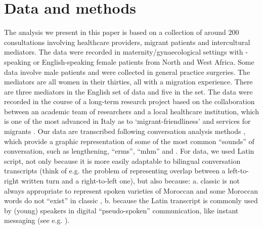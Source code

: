 \documentclass[output=paper]{LSP/langsci}
\begin{document}
\section{Data and methods}

The analysis we present in this paper is based on a collection of around 200 consultations involving healthcare providers, migrant patients and intercultural mediators. The data were recorded in maternity/gynaecological settings with -speaking or English-speaking female patients from North and West Afri\-ca. Some data involve male patients and were collected in general practice surgeries. The mediators are all women in their thirties, all with a migration experience. There are three mediators in the English set of data and five in the  set. The data were recorded in the course of a long-term research project based on the collaboration between an academic team of researchers and a local healthcare institution, which is one of the most advanced in Italy as to `migrant-friendliness' and services for migrants \citep{Chiarenza2008}. Our data are transcribed following conversation analysis methods \citep{Jefferson1978, Psathas1990}, which provide a graphic representation of some of the most common ``sounds'' of conversation, such as lengthening, ``erms'', ``mhm'' and . For  data, we used Latin script, not only because it is more easily adaptable to bilingual conversation transcripts (think of e.g. the problem of representing overlap between a left-to-right written  turn and a right-to-left  one), but also because: a. classic  is not always appropriate to represent spoken varieties of  {Moroccan} and some  {Moroccan} words do not ``exist'' in classic , b. because the Latin transcript is commonly used by  (young) speakers in digital ``pseudo-spoken'' communication, like instant messaging (see e.g. \citealt{Palfreyman2003}). 
\end{document}
